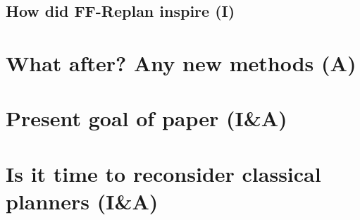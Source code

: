 \documentclass[runningheads,a4paper]{llncs}
\begin{document}
\subsection{How did FF-Replan inspire (I)}

\section{What after? Any new methods (A)}

\section{Present goal of paper (I\&A)}

\section{Is it time to reconsider classical planners (I\&A)}



\end{document}
